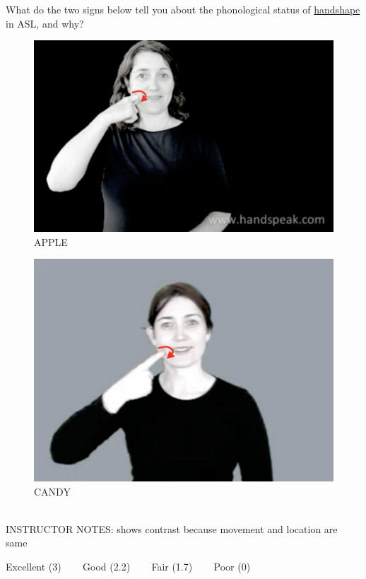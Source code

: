 \documentclass[12pt]{article}
\begin{document}
What do the two signs below tell you about the phonological status of \underline{handshape} in ASL, and why?\\

\begin{figure}[H]
\includegraphics{../images/asl_apple.png}
\caption{APPLE}
\end{figure}
\begin{figure}[H]
\includegraphics{../images/asl_candy.png}
\caption{CANDY}
\end{figure}

~\\
INSTRUCTOR NOTES: shows contrast because movement and location are same


\vfill
Excellent (3) ~~~ Good (2.2) ~~~ Fair (1.7) ~~~ Poor (0)
\newpage

\begin{center}
\textbf{{\color{red}{\HUGE END OF EXAM}}}\\

\end{center}
\newpage
\end{document}
